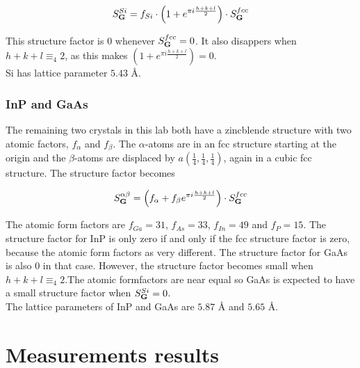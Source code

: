 \documentclass[a4paper,twoside=false,abstract=false,numbers=noenddot,
titlepage=false,headings=small,parskip=half,version=last]{scrartcl}
\begin{document}
\begin{equation}
    \label{eq:sistructure}
    S^{Si}_{\bold{G}}
    = f_{Si}\cdot \left( 1 + e^{\pi i \frac{h+k+l}{2}} \right) \cdot S^{fcc}_{\bold{G}}\nonumber
\end{equation}

This structure factor is $0$ whenever $S^{fcc}_{\bold{G}}=0$. It also disappers when $h+k+l\equiv_4 2$, as this makes $\left( 1 + e^{\pi i \frac{h+k+l}{2}} \right)=0$.\\
Si has lattice parameter $5.43$ Å.

\subsubsection{InP and GaAs}
The remaining two crystals in this lab both have a zincblende structure with two atomic factors, $f_\alpha$ and $f_\beta$.
The $\alpha$-atoms are in an fcc structure starting at the origin and the $\beta$-atoms are displaced by $a(\frac{1}{4},\frac{1}{4},\frac{1}{4})$, again in a cubic fcc structure.
The structure factor becomes

\begin{equation}
    \label{eq:zincblendestructure}
    S^{\alpha\beta}_{\bold{G}}
    = \left( f_\alpha + f_\beta e^{\pi i \frac{h+k+l}{2}} \right) \cdot S^{fcc}_{\bold{G}}\nonumber
\end{equation}

The atomic form factors are $f_{Ga}=31$, $f_{As}=33$, $f_{In}=49$ and $f_{P}=15$.
The structure factor for InP is only zero if and only if the fcc structure factor is zero, because the atomic form factors as very different.
The structure factor for GaAs is also 0 in that case. However, the structure factor becomes small when $h+k+l\equiv_4 2$.The atomic formfactors are near equal so GaAs is expected to have a small structure factor when $S_\bold{G}^{Si}=0$.\\
The lattice parameters of InP and GaAs are $5.87$ Å and $5.65$ Å.

\section{Measurements results}

\end{document}
